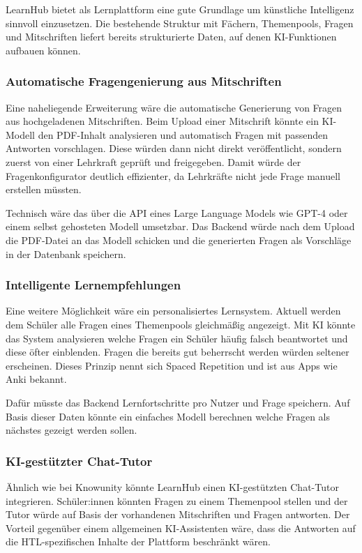 LearnHub bietet als Lernplattform eine gute Grundlage um künstliche 
Intelligenz sinnvoll einzusetzen. Die bestehende Struktur mit Fächern, 
Themenpools, Fragen und Mitschriften liefert bereits strukturierte 
Daten, auf denen KI-Funktionen aufbauen können.

\subsubsection{Automatische Fragengenierung aus Mitschriften}

Eine naheliegende Erweiterung wäre die automatische Generierung von 
Fragen aus hochgeladenen Mitschriften. Beim Upload einer Mitschrift 
könnte ein KI-Modell den PDF-Inhalt analysieren und automatisch 
Fragen mit passenden Antworten vorschlagen. Diese würden dann nicht 
direkt veröffentlicht, sondern zuerst von einer Lehrkraft geprüft 
und freigegeben. Damit würde der Fragenkonfigurator deutlich 
effizienter, da Lehrkräfte nicht jede Frage manuell erstellen 
müssten.

Technisch wäre das über die API eines Large Language Models wie 
GPT-4 oder einem selbst gehosteten Modell umsetzbar. Das Backend 
würde nach dem Upload die PDF-Datei an das Modell schicken und 
die generierten Fragen als Vorschläge in der Datenbank speichern.

\subsubsection{Intelligente Lernempfehlungen}

Eine weitere Möglichkeit wäre ein personalisiertes Lernsystem. 
Aktuell werden dem Schüler alle Fragen eines Themenpools 
gleichmäßig angezeigt. Mit KI könnte das System analysieren 
welche Fragen ein Schüler häufig falsch beantwortet und diese 
öfter einblenden. Fragen die bereits gut beherrscht werden 
würden seltener erscheinen. Dieses Prinzip nennt sich Spaced 
Repetition und ist aus Apps wie Anki bekannt.

Dafür müsste das Backend Lernfortschritte pro Nutzer und Frage 
speichern. Auf Basis dieser Daten könnte ein einfaches Modell 
berechnen welche Fragen als nächstes gezeigt werden sollen.

\subsubsection{KI-gestützter Chat-Tutor}

Ähnlich wie bei Knowunity könnte LearnHub einen KI-gestützten 
Chat-Tutor integrieren. Schüler:innen könnten Fragen zu einem 
Themenpool stellen und der Tutor würde auf Basis der vorhandenen 
Mitschriften und Fragen antworten. Der Vorteil gegenüber einem 
allgemeinen KI-Assistenten wäre, dass die Antworten auf die 
HTL-spezifischen Inhalte der Plattform beschränkt wären.


